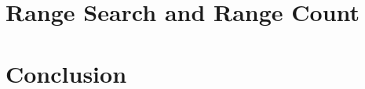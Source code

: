 \documentclass{article} %
\begin{document}


\section{Range Search and Range Count}
\label{sec:rs}




%

\section{Conclusion}






\appendix

\end{document}

